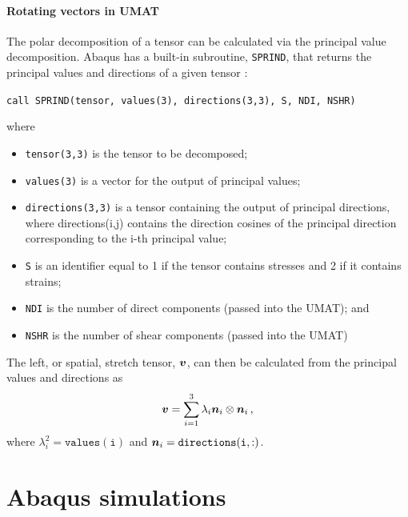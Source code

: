 \documentclass[10pt,letterpaper,oneside]{report}
\newcommand{\ten}[1]{\mbox{\boldmath $#1$}{}}
\begin{document}
\subsubsection{Rotating vectors in UMAT}
The polar decomposition of a tensor can be calculated via the principal value decomposition.  Abaqus has a built-in subroutine, \texttt{SPRIND}, that returns the principal values and directions of a given tensor :

\begin{center}
\texttt{call SPRIND(tensor, values(3), directions(3,3), S, NDI, NSHR)}
\end{center}

where 
\begin{itemize}
\item \texttt{tensor(3,3)} is the tensor to be decomposed;
\item \texttt{values(3)} is a vector for the output of principal values;
\item \texttt{directions(3,3)} is a tensor containing the output of principal directions, where directions(i,j) contains the direction cosines of the principal direction corresponding to the i-th principal value;
\item \texttt{S} is an identifier equal to 1 if the tensor contains stresses and 2 if it contains strains;
\item \texttt{NDI} is the number of direct components (passed into the UMAT); and
\item \texttt{NSHR} is the number of shear components (passed into the UMAT)
\end{itemize}

The left, or spatial, stretch tensor, $\ten{v}$, can then be calculated from the principal values and directions as 
\begin{align}
\ten{v} = \sum_{i=1}^3 \lambda_i \ten{n}_i \otimes \ten{n}_i \, , 
\end{align}
where $\lambda_i^2 = \mathtt{values(i)}$ and $\ten{n}_i = \mathtt{directions(i,:)}$.  


\chapter{Abaqus simulations}

\end{document}
